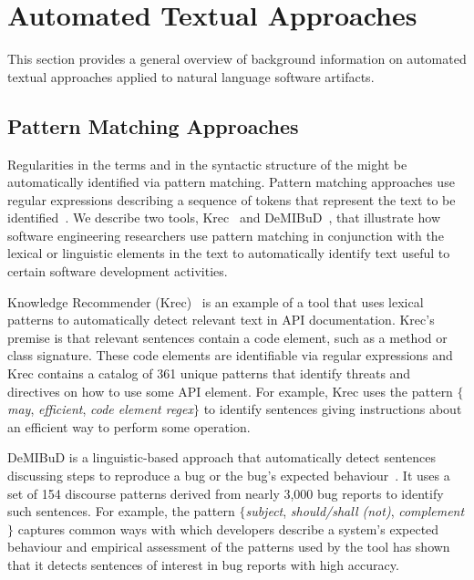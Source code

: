 





\section{Automated Textual Approaches}
\label{cp2:general-approaches}


This section provides a general overview of 
background information on automated textual approaches
applied to natural language software artifacts. 




\subsection{Pattern Matching Approaches}
\label{cp2:pattern-matching}


Regularities in the terms and in the syntactic structure of the 
might be automatically identified via pattern matching.
Pattern matching approaches use regular expressions describing a sequence of tokens that represent
the text to be identified~\cite{Bavota2016}. 
We describe two tools, Krec~\cite{Robillard2015}  and DeMIBuD~\cite{Chaparro2017}, that
illustrate how software engineering 
researchers use pattern matching in conjunction with the lexical or linguistic elements 
in the text to automatically identify 
text useful to certain software development activities.
    


Knowledge Recommender (Krec)~\cite{Robillard2015} 
is an example of a
 tool that uses lexical patterns to 
 automatically detect relevant text in  API documentation. 
Krec's premise is that relevant sentences contain a code element, such as a method or class signature.
These code elements are identifiable via regular expressions 
and Krec contains a catalog of 361 unique patterns 
that identify threats and directives on how to use some API element.
For example, Krec uses the pattern {\small \textit{$\{$may}, \textit{efficient}, \textit{code element regex$\}$}} 
to identify sentences giving instructions about an efficient way to 
perform some operation. 



{\small DeMIBuD} is a linguistic-based approach that 
automatically detect sentences discussing steps to reproduce 
a bug or the bug's expected behaviour~\cite{Chaparro2017}.
It uses a set of 154 discourse patterns
derived from nearly 3,000 bug reports 
to identify such sentences. 
For example, the pattern 
{\small \textit{$\{$subject}, \textit{should/shall (not)}, \textit{complement$\}$}}
captures common ways with which developers describe a system's expected behaviour
and empirical assessment of the patterns used by the tool has shown that it 
detects sentences of interest in bug reports with high accuracy.






